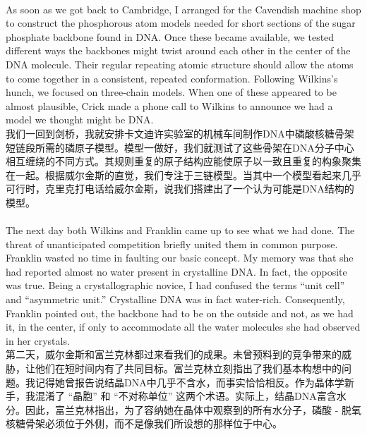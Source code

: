 \documentclass{article}
\begin{document}
\\
As soon as we got back to Cambridge, I arranged for the Cavendish machine shop to construct the phosphorous atom models needed for short sections of the sugar phosphate backbone found in DNA. Once these became available, we tested different ways the backbones might twist around each other in the center of the DNA molecule. Their regular repeating atomic structure should allow the atoms to come together in a consistent, repeated conformation. Following Wilkins’s hunch, we focused on three-chain models. When one of these appeared to be almost plausible, Crick made a phone call to Wilkins to announce we had a model we thought might be DNA.\\
我们一回到剑桥，我就安排卡文迪许实验室的机械车间制作DNA中磷酸核糖骨架短链段所需的磷原子模型。模型一做好，我们就测试了这些骨架在DNA分子中心相互缠绕的不同方式。其规则重复的原子结构应能使原子以一致且重复的构象聚集在一起。根据威尔金斯的直觉，我们专注于三链模型。当其中一个模型看起来几乎可行时，克里克打电话给威尔金斯，说我们搭建出了一个认为可能是DNA结构的模型。\\

\\
The next day both Wilkins and Franklin came up to see what we had done. The threat of unanticipated competition briefly united them in common purpose. Franklin wasted no time in faulting our basic concept. My memory was that she had reported almost no water present in crystalline DNA. In fact, the opposite was true. Being a crystallographic novice, I had confused the terms “unit cell” and “asymmetric unit.” Crystalline DNA was in fact water-rich. Consequently, Franklin pointed out, the backbone had to be on the outside and not, as we had it, in the center, if only to accommodate all the water molecules she had observed in her crystals.\\
第二天，威尔金斯和富兰克林都过来看我们的成果。未曾预料到的竞争带来的威胁，让他们在短时间内有了共同目标。富兰克林立刻指出了我们基本构想中的问题。我记得她曾报告说结晶DNA中几乎不含水，而事实恰恰相反。作为晶体学新手，我混淆了 “晶胞” 和 “不对称单位” 这两个术语。实际上，结晶DNA富含水分。因此，富兰克林指出，为了容纳她在晶体中观察到的所有水分子，磷酸 - 脱氧核糖骨架必须位于外侧，而不是像我们所设想的那样位于中心。\\
\end{document}
